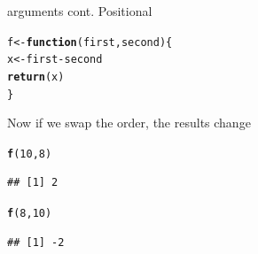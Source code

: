 \documentclass{beamer}\usepackage[]{graphicx}\usepackage[]{color}
\makeatletter
\newcommand{\hlnum}[1]{\textcolor[rgb]{0.686,0.059,0.569}{#1}}%
\newcommand{\hlopt}[1]{\textcolor[rgb]{0,0,0}{#1}}%
\newcommand{\hlstd}[1]{\textcolor[rgb]{0.345,0.345,0.345}{#1}}%
\newcommand{\hlkwa}[1]{\textcolor[rgb]{0.161,0.373,0.58}{\textbf{#1}}}%
\newcommand{\hlkwb}[1]{\textcolor[rgb]{0.69,0.353,0.396}{#1}}%
\newcommand{\hlkwc}[1]{\textcolor[rgb]{0.333,0.667,0.333}{#1}}%
\newcommand{\hlkwd}[1]{\textcolor[rgb]{0.737,0.353,0.396}{\textbf{#1}}}%
\newenvironment{kframe}{%
 \def\at@end@of@kframe{}%
 \ifinner\ifhmode%
  \def\at@end@of@kframe{\end{minipage}}%
  \begin{minipage}{\columnwidth}%
 \fi\fi%
 \def\FrameCommand##1{\hskip\@totalleftmargin \hskip-\fboxsep
 \colorbox{shadecolor}{##1}\hskip-\fboxsep
     \hskip-\linewidth \hskip-\@totalleftmargin \hskip\columnwidth}%
 \MakeFramed {\advance\hsize-\width
   \@totalleftmargin\z@ \linewidth\hsize
   \@setminipage}}%
 {\par\unskip\endMakeFramed%
 \at@end@of@kframe}
\newenvironment{knitrout}{}{} %
\makeatother
\begin{document}
\begin{frame}[fragile]{arguments cont.}
Positional
\linebreak
\begin{knitrout}
\color{fgcolor}\begin{kframe}
\begin{alltt}
\hlstd{f} \hlkwb{<-} \hlkwa{function}\hlstd{(}\hlkwc{first}\hlstd{,} \hlkwc{second}\hlstd{) \{}
    \hlstd{x} \hlkwb{<-} \hlstd{first} \hlopt{-} \hlstd{second}
    \hlkwd{return}\hlstd{(x)}
\hlstd{\}}
\end{alltt}
\end{kframe}
\end{knitrout}

Now if we swap the order, the results change
\begin{knitrout}
\color{fgcolor}\begin{kframe}
\begin{alltt}
\hlkwd{f}\hlstd{(}\hlnum{10}\hlstd{,} \hlnum{8}\hlstd{)}
\end{alltt}
\begin{verbatim}
## [1] 2
\end{verbatim}
\begin{alltt}
\hlkwd{f}\hlstd{(}\hlnum{8}\hlstd{,} \hlnum{10}\hlstd{)}
\end{alltt}
\begin{verbatim}
## [1] -2
\end{verbatim}
\end{kframe}
\end{knitrout}

\end{frame}
\end{document}
